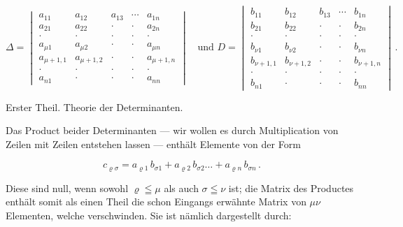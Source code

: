 \[
\Delta =
\begin{vmatrix}
a_{11} & a_{12} & a_{13} & \cdots & a_{1n} \\
a_{21} & a_{22} & \cdot & \cdot & a_{2n} \\
\cdot & \cdot & \cdot & \cdot & \cdot \\
a_{\mu 1} & a_{\mu 2} & \cdot & \cdot & a_{\mu n} \\
a_{\mu+1,1} & a_{\mu+1,2} & \cdot & \cdot & a_{\mu+1,n} \\
\cdot & \cdot & \cdot & \cdot & \cdot \\
a_{n1} & \cdot & \cdot & \cdot & a_{nn}
\end{vmatrix}
\quad\text{und } D=
\begin{vmatrix}
b_{11} & b_{12} & b_{13} & \cdots & b_{1n} \\
b_{21} & b_{22} & \cdot & \cdot & b_{2n} \\
\cdot & \cdot & \cdot & \cdot & \cdot \\
b_{\nu 1} & b_{\nu 2} & \cdot & \cdot & b_{\nu n} \\
b_{\nu+1,1} & b_{\nu+1,2} & \cdot & \cdot & b_{\nu+1,n} \\
\cdot & \cdot & \cdot & \cdot & \cdot \\
b_{n1} & \cdot & \cdot & \cdot & b_{nn}
\end{vmatrix}\, .
\]


Erster Theil. Theorie der Determinanten.

Das Product beider Determinanten — wir wollen es durch Multiplication von Zeilen mit Zeilen entstehen lassen — enthält Elemente von der Form

\[
c_{\varrho\sigma} = a_{\varrho 1}\, b_{\sigma 1} + a_{\varrho 2}\, b_{\sigma 2} \ldots + a_{\varrho n}\, b_{\sigma n}\, .
\]

Diese sind null, wenn sowohl $\varrho\leqq\mu$ als auch $\sigma\leqq\nu$ ist; die Matrix des Productes enthält somit als einen Theil die schon Eingangs erwähnte Matrix von $\mu\nu$ Elementen, welche verschwinden. Sie ist nämlich dargestellt durch:

